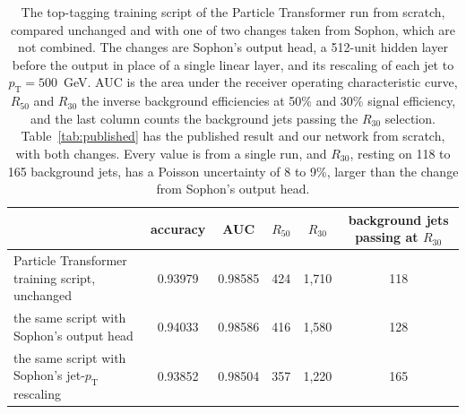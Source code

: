 \begin{landscape}
\begin{table}[t]
\centering
\caption{The top-tagging training script of the Particle Transformer run from scratch, compared unchanged and with one of two changes taken from Sophon, which are not combined. The changes are Sophon's output head, a 512-unit hidden layer before the output in place of a single linear layer, and its rescaling of each jet to $p_{\mathrm{T}}=500$~GeV. AUC is the area under the receiver operating characteristic curve, $R_{50}$ and $R_{30}$ the inverse background efficiencies at 50\% and 30\% signal efficiency, and the last column counts the background jets passing the $R_{30}$ selection. Table~\ref{tab:published} has the published result and our network from scratch, with both changes. Every value is from a single run, and $R_{30}$, resting on 118 to 165 background jets, has a Poisson uncertainty of 8 to 9\%, larger than the change from Sophon's output head.}
\label{tab:partrepro}
\begin{tabular*}{\linewidth}{@{\extracolsep{\fill}}lccccc@{}}
\toprule
 & accuracy & AUC & $R_{50}$ & $R_{30}$ & background jets passing at $R_{30}$ \\
\midrule
Particle Transformer training script, unchanged & 0.93979 & 0.98585 & 424 & 1{,}710 & 118 \\
the same script with Sophon's output head & 0.94033 & 0.98586 & 416 & 1{,}580 & 128 \\
the same script with Sophon's jet-$p_{\mathrm{T}}$ rescaling & 0.93852 & 0.98504 & 357 & 1{,}220 & 165 \\
\bottomrule
\end{tabular*}
\end{table}
\end{landscape}
